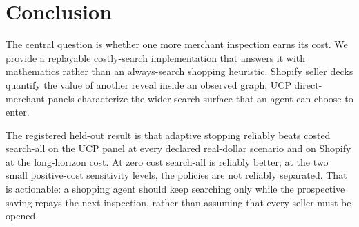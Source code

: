 \section{Conclusion}
\label{sec:conclusion}

The central question is whether one more merchant inspection earns its cost. We
provide a replayable costly-search implementation that answers it with mathematics
rather than an always-search shopping heuristic. Shopify seller decks quantify the value of
another reveal inside an observed graph; UCP direct-merchant panels characterize the
wider search surface that an agent can choose to enter.

The registered held-out result is that adaptive stopping reliably beats costed
search-all on the UCP panel at every declared real-dollar scenario and on Shopify at
the long-horizon cost. At zero cost search-all is reliably better; at the two small
positive-cost sensitivity levels, the policies are not reliably separated.
That is actionable: a shopping agent should keep searching only while the prospective
saving repays the next inspection, rather than assuming that every seller must be
opened.